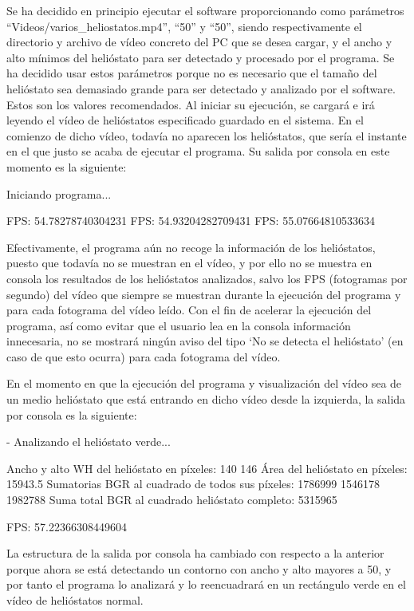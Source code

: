\documentclass[12pt]{article}
\begin{document}
Se ha decidido en principio ejecutar el software proporcionando como parámetros “Videos/varios\_heliostatos.mp4”, “50” y “50”, siendo respectivamente el directorio y archivo de vídeo concreto del PC que se desea cargar, y el ancho y alto mínimos del helióstato para ser detectado y procesado por el programa. Se ha decidido usar estos parámetros porque no es necesario que el tamaño del helióstato sea demasiado grande para ser detectado y analizado por el software. Estos son los valores recomendados. Al iniciar su ejecución, se cargará e irá leyendo el vídeo de helióstatos especificado guardado en el sistema. En el comienzo de dicho vídeo, todavía no aparecen los helióstatos, que sería el instante en el que justo se acaba de ejecutar el programa. Su salida por consola en este momento es la siguiente:
 
Iniciando programa...

FPS: 54.78278740304231
FPS: 54.93204282709431
FPS: 55.07664810533634

Efectivamente, el programa aún no recoge la información de los helióstatos, puesto que todavía no se muestran en el vídeo, y por ello no se muestra en consola los resultados de los helióstatos analizados, salvo los FPS (fotogramas por segundo) del vídeo que siempre se muestran durante la ejecución del programa y para cada fotograma del vídeo leído. Con el fin de acelerar la ejecución del programa, así como evitar que el usuario lea en la consola información innecesaria, no se mostrará ningún aviso del tipo ‘No se detecta el helióstato’ (en caso de que esto ocurra) para cada fotograma del vídeo.

En el momento en que la ejecución del programa y visualización del vídeo sea de un medio helióstato que está entrando en dicho vídeo desde la izquierda, la salida por consola es la siguiente:

- Analizando el helióstato verde...

Ancho y alto WH del helióstato en píxeles:        140  146
Área del helióstato en píxeles:                   15943.5
Sumatorias BGR al cuadrado de todos sus píxeles:  1786999  1546178  1982788
Suma total BGR al cuadrado helióstato completo:   5315965

FPS: 57.22366308449604
 
La estructura de la salida por consola ha cambiado con respecto a la anterior porque ahora se está detectando un contorno con ancho y alto mayores a 50, y por tanto el programa lo analizará y lo reencuadrará en un rectángulo verde en el vídeo de helióstatos normal.
\end{document}
